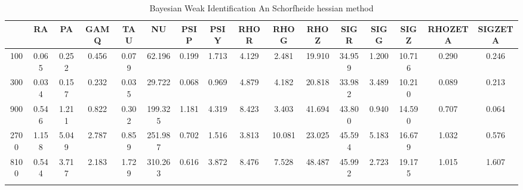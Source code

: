 \documentclass[a4paper,10pt]{article}
\begin{document}
\centering
\begin{longtable}{cccccccccccccccc}
\toprule
 & RA & PA & GAMQ & TAU & NU & PSIP & PSIY & RHOR & RHOG & RHOZ & SIGR & SIGG & SIGZ & RHOZETA & SIGZETA \\
\midrule
100 & 0.065 & 0.252 & 0.456 & 0.079 & 62.196 & 0.199 & 1.713 & 4.129 & 2.481 & 19.910 & 34.959 & 1.200 & 10.716 & 0.290 & 0.246 \\
300 & 0.034 & 0.157 & 0.232 & 0.035 & 29.722 & 0.068 & 0.969 & 4.879 & 4.182 & 20.818 & 33.982 & 3.489 & 10.210 & 0.089 & 0.213 \\
900 & 0.546 & 1.211 & 0.822 & 0.302 & 199.325 & 1.181 & 4.319 & 8.423 & 3.403 & 41.694 & 43.800 & 0.940 & 14.590 & 0.707 & 0.064 \\
2700 & 1.158 & 5.049 & 2.787 & 0.859 & 251.987 & 0.702 & 1.516 & 3.813 & 10.081 & 23.025 & 45.594 & 5.183 & 16.679 & 1.032 & 0.576 \\
8100 & 0.544 & 3.717 & 2.183 & 1.729 & 310.263 & 0.616 & 3.872 & 8.476 & 7.528 & 48.487 & 45.992 & 2.723 & 19.175 & 1.015 & 1.607 \\
\bottomrule
\caption{Bayesian Weak Identification An Schorfheide hessian method}
\label{table:tbl:WeakAnScho_hessian}
\end{longtable}
\end{document}
